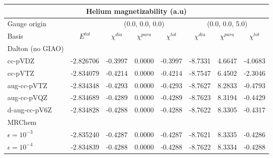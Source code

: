 \begin{frame}
\begin{table}
\tiny
\centering
\begin{tabular}{l|l|lll|lll}
\multicolumn{8}{c}{ Helium magnetizability (a.u) }\\
\hline
\hline
\multicolumn{1}{l}{Gauge origin}&
\multicolumn{1}{c}{}&
\multicolumn{3}{c}{(0.0, 0.0, 0.0) }&
\multicolumn{3}{c}{(0.0, 0.0, 5.0) }\\
\hline
Basis&
\multicolumn{1}{c|}{$E^{tot}$}&
\multicolumn{1}{c}{$\chi^{dia}$}&
\multicolumn{1}{c}{$\chi^{para}$}&
\multicolumn{1}{c|}{$\chi^{tot}$}&
\multicolumn{1}{c}{$\chi^{dia}$}&
\multicolumn{1}{c}{$\chi^{para}$}&
\multicolumn{1}{c}{$\chi^{tot}$}\\
\hline			
Dalton (no GIAO)        &         &       &      &       &       &      &       \\
cc-pVDZ	                &-2.826706&-0.3997&0.0000&-0.3997&-8.7331&4.6647&-4.0683\\
cc-pVTZ	                &-2.834079&-0.4214&0.0000&-0.4214&-8.7547&6.4502&-2.3046\\
aug-cc-pVTZ             &-2.834348&-0.4293&0.0000&-0.4293&-8.7627&8.2833&-0.4793\\
aug-cc-pVQZ             &-2.834689&-0.4289&0.0000&-0.4289&-8.7623&8.3194&-0.4429\\
d-aug-cc-pV6Z           &-2.834828&-0.4288&0.0000&-0.4288&-8.7622&8.3305&-0.4317\\
\hline			                                                                                                        
MRChem                  &         &       &      &       &       &      &       \\
$\epsilon = 10^{-3}$    &-2.835240&-0.4287&0.0000&-0.4287&-8.7621&8.3335&-0.4286\\
$\epsilon = 10^{-4}$    &-2.834839&-0.4288&0.0000&-0.4288&-8.7622&8.3334&-0.4288\\
\hline
\hline
\end{tabular}
\end{table}
\end{frame}

